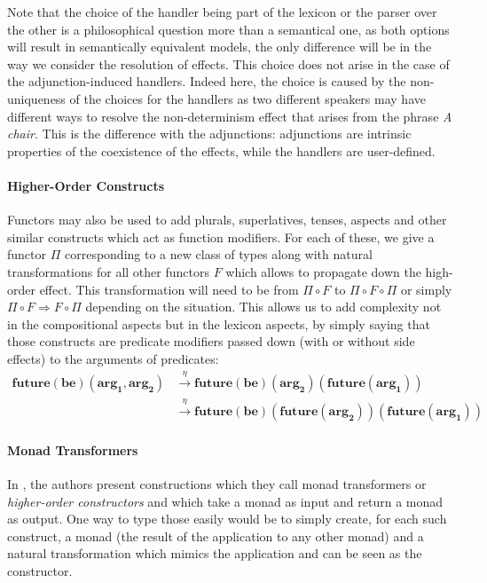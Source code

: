 \smallskip

Note that the choice of the handler being part of the lexicon or the parser
over the other is a philosophical question more than a semantical one, as both
options will result in semantically equivalent models, the only difference will
be in the way we consider the resolution of effects.
This choice does not arise in the case of the adjunction-induced
handlers.
Indeed here, the choice is caused by the non-uniqueness of the choices for
the handlers as two different speakers may have different ways to resolve the
non-determinism effect that arises from the phrase \textsl{A chair}.
This is the difference with the adjunctions: adjunctions are intrinsic
properties of the coexistence of the effects, while the handlers
are user-defined.

\paragraph{Higher-Order Constructs}
\label{par:higherorder}
Functors may also be used to add plurals, superlatives, tenses, aspects and
other similar constructs which act as function modifiers.
For each of these, we give a functor $\Pi$ corresponding to a new class of
types along with natural transformations for all other functors $F$ which
allows to propagate down the high-order effect.
This transformation will need to be from $\Pi \circ F$ to
$\Pi \circ F \circ \Pi$ or simply $\Pi \circ F \Rightarrow F \circ \Pi$
depending on the situation.
This allows us to add complexity not in the compositional aspects but
in the lexicon aspects, by simply saying that those constructs are predicate
modifiers passed down (with or without side effects) to the arguments of
predicates:
\begin{equation*}
	\begin{aligned}
		\mathbf{future\left( be \right)\left( arg_{1}, arg_{2} \right)}
		 & \xrightarrow{\eta} \mathbf{future\left( be \right)\left( arg_{2} \right)\left( future\left( arg_{1} \right) \right)}                           \\
		 & \xrightarrow{\eta} \mathbf{future \left( be \right) \left( future \left( arg_{2} \right) \right) \left( future \left( arg_{1} \right) \right)}
	\end{aligned}
\end{equation*}


\paragraph{Monad Transformers}
In \cite{bumfordEffectdrivenInterpretationFunctors2025}, the authors present
constructions which they call monad transformers or \emph{higher-order
	constructors} and which take a monad as input and return a monad as output.
One way to type those easily would be to simply create, for each such
construct, a monad (the result of the application to any other monad) and a
natural transformation which mimics the application and can be seen as the
constructor.

